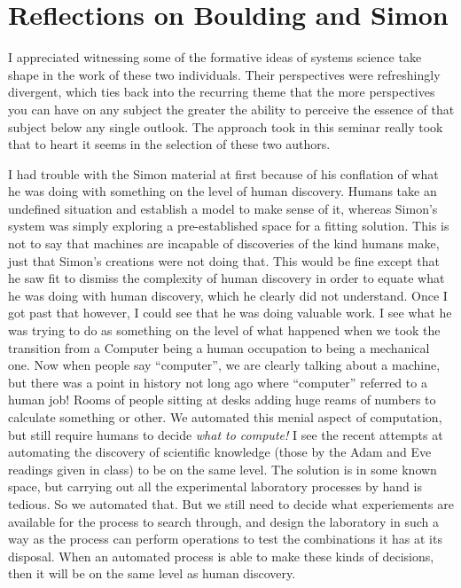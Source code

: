 \documentclass[12pt]{article}
\begin{document}
\maketitle

\section{Reflections on Boulding and Simon}

I appreciated witnessing some of the formative ideas of systems science take shape in the work of these two individuals.  Their perspectives were refreshingly divergent, which ties back into the recurring theme that the more perspectives you can have on any subject the greater the ability to perceive the essence of that subject below any single outlook.  The approach took in this seminar really took that to heart it seems in the selection of these two authors.

I had trouble with the Simon material at first because of his conflation of what he was doing with something on the level of human discovery.  Humans take an undefined situation and establish a model to make sense of it, whereas Simon's system was simply exploring a pre-established space for a fitting solution.  This is not to say that machines are incapable of discoveries of the kind humans make, just that Simon's creations were not doing that.  This would be fine except that he saw fit to dismiss the complexity of human discovery in order to equate what he was doing with human discovery, which he clearly did not understand.  Once I got past that however, I could see that he was doing valuable work.  I see what he was trying to do as something on the level of what happened when we took the transition from a Computer being a human occupation to being a mechanical one.  Now when people say ``computer'', we are clearly talking about a machine, but there was a point in history not long ago where ``computer'' referred to a human job!  Rooms of people sitting at desks adding huge reams of numbers to calculate something or other.  We automated this menial aspect of computation, but still require humans to decide \emph{what to compute!}  I see the recent attempts at automating the discovery of scientific knowledge (those by the Adam and Eve readings given in class) to be on the same level.  The solution is in some known space, but carrying out all the experimental laboratory processes by hand is tedious.  So we automated that.  But we still need to decide what experiements are available for the process to search through, and design the laboratory in such a way as the process can perform operations to test the combinations it has at its disposal.  When an automated process is able to make these kinds of decisions, then it will be on the same level as human discovery.  
\end{document}
